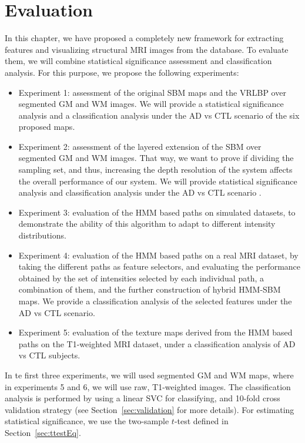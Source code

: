 \section{Evaluation}
In this chapter, we have proposed a completely new framework for extracting features and visualizing structural \ac{MRI} images from the \adnimri{} database. To evaluate them, we will combine statistical significance assessment and classification analysis. For this purpose, we propose the following experiments: 
\begin{itemize}
	\item Experiment 1: assessment of the original \ac{SBM} maps and the \ac{VRLBP} over segmented \ac{GM} and \ac{WM} images. We will provide a statistical significance analysis and a classification analysis under the \ac{AD} vs \ac{CTL} scenario of the six proposed maps. 
	\item Experiment 2: assessment of the layered extension of the \ac{SBM} over segmented \ac{GM} and \ac{WM} images. That way, we want to prove if dividing the sampling set, and thus, increasing the depth resolution of the system affects the overall performance of our system. We will provide statistical significance analysis and classification analysis under the \ac{AD} vs \ac{CTL} scenario . 
	\item Experiment 3: evaluation of the \ac{HMM} based paths on simulated datasets, to demonstrate the ability of this algorithm to adapt to different intensity distributions. 
	\item Experiment 4: evaluation of the \ac{HMM} based paths on a real \ac{MRI} dataset, by taking the different paths as feature selectors, and evaluating the performance obtained by the set of intensities selected by each individual path, a combination of them, and the further construction of hybrid \ac{HMM}-\ac{SBM} maps. We provide a classification analysis of the selected features under the \ac{AD} vs \ac{CTL} scenario. 
	\item Experiment 5: evaluation of the texture maps derived from the \ac{HMM} based paths on the T1-weighted \ac{MRI} dataset, under a classification analysis of \ac{AD} vs \ac{CTL} subjects. 
\end{itemize}

In te first three experiments, we will used segmented \ac{GM} and \ac{WM} maps, where in experiments 5 and 6, we will use raw, T1-weighted images. The classification analysis is performed by using a linear \ac{SVC} for classifying, and 10-fold cross validation strategy (see Section~\ref{sec:validation} for more details). For estimating statistical significance, we use the two-sample $t$-test defined in Section~\ref{sec:ttestEq}. 


